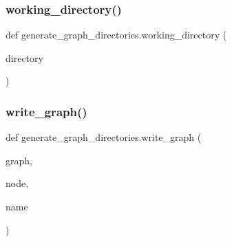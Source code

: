 \subsubsection{\texorpdfstring{working\+\_\+directory()}{working\_directory()}}
{\footnotesize\ttfamily def generate\+\_\+graph\+\_\+directories.\+working\+\_\+directory (\begin{DoxyParamCaption}\item[{}]{directory }\end{DoxyParamCaption})}

\mbox{\label{namespacegenerate__graph__directories_ab9f0035540a4fa069e1077bc1eb8e419_ab9f0035540a4fa069e1077bc1eb8e419}} 
\subsubsection{\texorpdfstring{write\+\_\+graph()}{write\_graph()}}
{\footnotesize\ttfamily def generate\+\_\+graph\+\_\+directories.\+write\+\_\+graph (\begin{DoxyParamCaption}\item[{}]{graph,  }\item[{}]{node,  }\item[{}]{name }\end{DoxyParamCaption})}

